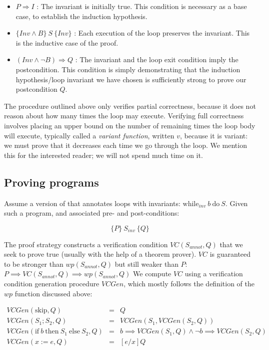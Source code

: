 \documentclass[11pt]{article}
\begin{document}
\begin{itemize}
\item $P \Rightarrow I$ : The invariant is initially true.  This condition is
  necessary as a base case, to establish the induction hypothesis.

\item $\{ Inv \land B \} ~S~ \{Inv\}$ : Each execution of the loop preserves the
  invariant.  This is the inductive case of the proof.

\item $(Inv \land \lnot B) \Rightarrow Q$ : The invariant and the loop exit
  condition imply the postcondition.  This condition is simply demonstrating
  that the induction hypothesis/loop invariant we have chosen is sufficiently
  strong to prove our postcondition $Q$.
\end{itemize}

The procedure outlined above only verifies partial correctness, because it does
not reason about how many times the loop may execute.  Verifying full
correctness involves placing an upper bound on the number of remaining times the
loop body will execute, typically called a \textit{variant function}, written
$v$, because it is variant: we must prove that it decreases each time we go
through the loop.  We mention this for the interested reader; we will not spend
much time on it.

\subsection{Proving programs}

Assume a version of \WhileLang that annotates loops with invariants:
$\mbox{while}_{inv}~b~\mbox{do}~S$.
%
Given such a program, and associated pre- and post-conditions:

\[
\{ P \} ~ S_{inv}~ \{ Q \}
\]

The proof strategy constructs a verification condition $VC(S_{annot}, Q)$ that
we seek to prove true (usually with the help of a theorem prover).  $VC$ is
guaranteed to be stronger than $wp(S_{annot}, Q)$ but still weaker than $P$: $P
\implies VC(S_{annot}, Q) \implies wp(S_{annot}, Q)$ We compute $VC$ using a
verification condition generation procedure $VCGen$, which mostly follows the
definition of the $wp$ function discussed above:

\begin{center}
\[
\begin{array}{lcl}
VCGen(\mbox{skip}, Q) & = & Q \\
VCGen(S_1; S_2, Q) & = & VCGen(S_1, VCGen(S_2, Q)) \\
VCGen(\mbox{if}~b~\mbox{then}~S_1~\mbox{else}~S_2, Q) & = & b \implies VCGen(S_1, Q) \wedge \neg b \implies VCGen(S_2, Q) \\
VCGen(x := e, Q) & = & [e/x] Q \\
\end{array}
\]
\end{center}
\end{document}
